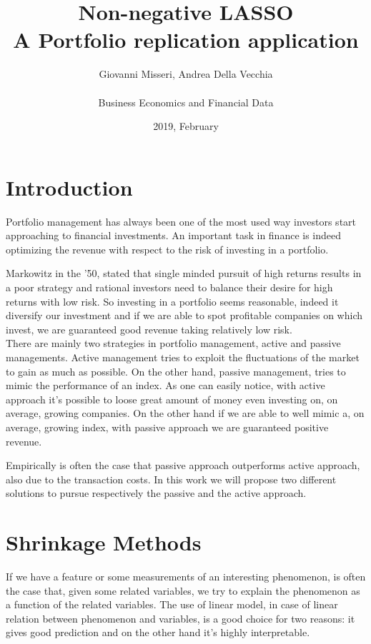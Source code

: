 \documentclass{article}%
\title{%
  Non-negative LASSO \\
  \large A Portfolio replication application}
\date{2019, February}
\author{Giovanni Misseri, Andrea Della Vecchia \\ \\ 
Business Economics and Financial Data}
\begin{document}
\maketitle
\tableofcontents
\newpage
\section{Introduction}

Portfolio management has always been one of the most used way investors start approaching to financial investments. An important task in finance is indeed optimizing the revenue with respect to the risk of investing in a portfolio.

Markowitz in the '50, stated that single minded pursuit of high returns results in a poor strategy and rational investors need to balance their desire for high returns with low risk. So investing in a portfolio seems reasonable, indeed it diversify our investment and if we are able to spot profitable companies on which invest, we are guaranteed good revenue taking relatively low risk.
\\

There are mainly two strategies in portfolio management, active and passive managements. Active management tries to exploit the fluctuations of the market to gain as much as possible. On the other hand, passive management, tries to mimic the performance of an index. As one can easily notice, with active approach it's possible to loose great amount of money even investing on, on average, growing companies. On the other hand if we are able to well mimic a, on average, growing index, with passive approach we are guaranteed positive revenue.

Empirically is often the case that passive approach outperforms active approach, also due to the transaction costs. In this work we will propose two different solutions to pursue respectively the passive and the active approach.

\newpage
\section{Shrinkage Methods}

If we have a feature or some measurements of an interesting phenomenon, is often the case that, given some related variables, we try to explain the phenomenon as a function of the related variables. The use of linear model, in case of linear relation between phenomenon and variables, is a good choice for two reasons: it gives good prediction and on the other hand it's highly interpretable. 
\end{document}
